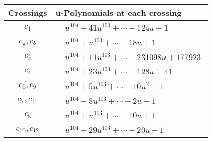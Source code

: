 \documentclass[1p]{elsarticle_modified}
\theoremstyle{definition}
\begin{document}
\begin{tabular}{m{50pt}|m{274pt}}
Crossings & \hspace{64pt}u-Polynomials at each crossing \\
\hline $$\begin{aligned}c_{1}\end{aligned}$$&$\begin{aligned}
&u^{104}+41 u^{103}+\cdots+124 u+1
\end{aligned}$\\
\hline $$\begin{aligned}c_{2},c_{5}\end{aligned}$$&$\begin{aligned}
&u^{104}+u^{103}+\cdots-18 u+1
\end{aligned}$\\
\hline $$\begin{aligned}c_{3}\end{aligned}$$&$\begin{aligned}
&u^{104}+11 u^{103}+\cdots-231098 u+177923
\end{aligned}$\\
\hline $$\begin{aligned}c_{4}\end{aligned}$$&$\begin{aligned}
&u^{104}+23 u^{103}+\cdots+128 u+41
\end{aligned}$\\
\hline $$\begin{aligned}c_{6},c_{9}\end{aligned}$$&$\begin{aligned}
&u^{104}+5 u^{103}+\cdots+10 u^2+1
\end{aligned}$\\
\hline $$\begin{aligned}c_{7},c_{11}\end{aligned}$$&$\begin{aligned}
&u^{104}-5 u^{103}+\cdots-2 u+1
\end{aligned}$\\
\hline $$\begin{aligned}c_{8}\end{aligned}$$&$\begin{aligned}
&u^{104}+u^{103}+\cdots-10 u+1
\end{aligned}$\\
\hline $$\begin{aligned}c_{10},c_{12}\end{aligned}$$&$\begin{aligned}
&u^{104}+29 u^{103}+\cdots+20 u+1
\end{aligned}$\\
\hline
\end{tabular}\\~\\
\end{document}
